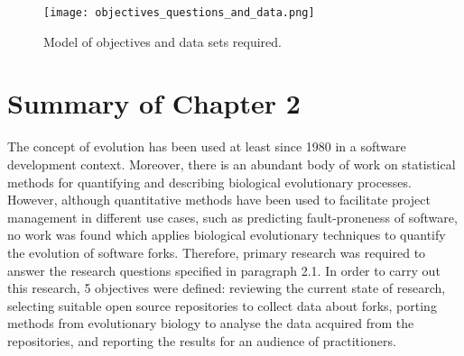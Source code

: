\begin{figure}[H]
  \texttt{[image: objectives\_questions\_and\_data.png]}
  \caption{Model of objectives and data sets required.}
  \label{fig:objectives}
\end{figure}


\section{Summary of Chapter 2}
The concept of evolution has been used at least since 1980 in a software development context. Moreover, there is an abundant body of work on statistical methods for quantifying and describing biological evolutionary processes. However, although quantitative methods have been used to facilitate project management in different use cases, such as predicting fault-proneness of software, no work was found which applies biological evolutionary techniques to quantify the evolution of software forks. Therefore, primary research was required to answer the research questions specified in paragraph 2.1. In order to carry out this research, 5 objectives were defined: reviewing the current state of research, selecting suitable open source repositories to collect data about forks, porting methods from evolutionary biology to analyse the data acquired from the repositories, and reporting the results for an audience of practitioners.

